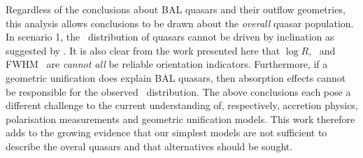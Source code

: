 Regardless of the conclusions about BAL quasars and their outflow geometries,
this analysis allows conclusions to be drawn about the {\em overall} 
quasar population. In scenario 1, the \ewo\ distribution of quasars cannot
be driven by inclination as suggested by \citep{risaliti2011}. 
It is also clear from the work presented here that $\log R$, \ewo\ and FWHM \hb\ 
are {\em cannot all} be reliable orientation indicators. 
Furthermore, if a geometric unification does explain BAL quasars, then 
absorption effects cannot be responsible for the observed \ewo\ distribution.
The above conclusions each pose a different challenge to the current
understanding of, respectively, accretion physics, polarisation measurements 
and geometric unification models. This work therefore adds to the
growing evidence that our simplest models are not sufficient to
describe the overal quasars and that alternatives should be sought.


